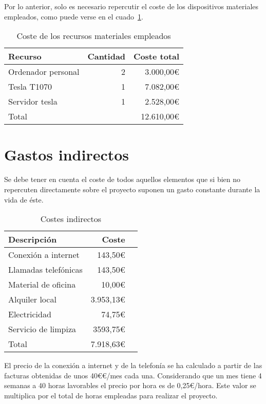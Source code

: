 Por lo anterior, solo es necesario repercutir el coste de los dispositivos materiales empleados, como puede verse en el cuado~\ref{tab:re_mat}.

\begin{table}
	\centering
	
	\begin{tabular}{|l|r|r|}
		\hline
		Recurso & Cantidad & Coste total \\
		\hline
		Ordenador personal & 2 & 3.000,00\euro \\
		\hline
		Tesla T1070 & 1 & 7.082,00\euro \\
		\hline
		Servidor tesla & 1 & 2.528,00\euro\\
		\hline
		\hline
		\multicolumn{2}{|l|}{Total} & 12.610,00\euro\\
		\hline
	\end{tabular}
	\caption{Coste de los recursos materiales empleados}\label{tab:re_mat}
\end{table}

\section{Gastos indirectos}

Se debe tener en cuenta el coste de todos aquellos elementos que si bien no repercuten directamente sobre el proyecto suponen un gasto constante durante la vida de éste.

\begin{table}
	\centering
	
	\begin{tabular}{|l|r|r|}
		\hline
		Descripción & Coste \\
		\hline
		Conexión a internet & 143,50\euro \\
		\hline
		Llamadas telefónicas & 143,50\euro \\
		\hline
		Material de oficina & 10,00\euro\\
		\hline
		Alquiler local & 3.953,13\euro\\
		\hline
		Electricidad & 74,75\euro\\
		\hline
		Servicio de limpiza & 3593,75\euro\\
		
		\hline
		\hline
		Total & 7.918,63\euro\\
		\hline
	\end{tabular}
	\caption{Costes indirectos}\label{tab:cost_indi}
\end{table}

El precio de la conexión a internet y de la telefonía se ha calculado a partir de las facturas obtenidas de unos 40€\euro/mes cada una. Considerando que un mes tiene 4 semanas a 40 horas lavorables el precio por hora es de 0,25\euro/hora. Este valor se multiplica por el total de horas empleadas para realizar el proyecto.

